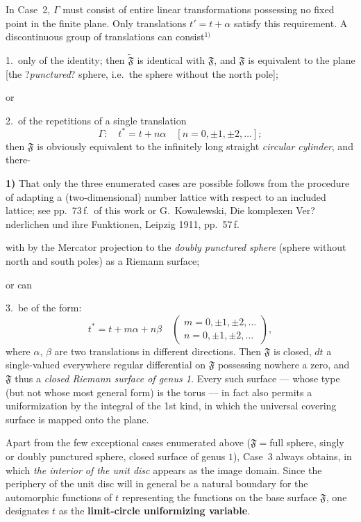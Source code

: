 \documentclass{article}
\begin{document}
In Case~2, $\varGamma$ must consist of entire linear transformations possessing no fixed point in the finite plane. Only translations $t' = t + \alpha$ satisfy this requirement. A discontinuous group of translations can consist${}^{1)}$

1.\ only of the identity; then $\widetilde{\mathfrak{F}}$ is identical with $\mathfrak{F}$, and $\mathfrak{F}$ is equivalent to the plane [the ?\emph{punctured}? sphere, i.e.\ the sphere without the north pole];

or

2.\ of the repetitions of a single translation
\[ \varGamma\colon \quad t^* = t + n\alpha \quad [n = 0, \pm 1, \pm 2, \dots]; \]
then $\mathfrak{F}$ is obviously equivalent to the infinitely long straight \emph{circular cylinder}, and there-

\textbf{1)} That only the three enumerated cases are possible follows from the procedure of adapting a (two-dimensional) number lattice with respect to an included lattice; see pp.~73\,f.\ of this work or G.~Kowalewski, Die komplexen Ver?nderlichen und ihre Funktionen, Leipzig 1911, pp.~57\,f.

with by the Mercator projection to the \emph{doubly punctured sphere} (sphere without north and south poles) as a Riemann surface;

or can

3.\ be of the form:
\[ t^* = t + m\alpha + n\beta \quad \begin{pmatrix} m = 0, \pm 1, \pm 2, \dots \\ n = 0, \pm 1, \pm 2, \dots \end{pmatrix}, \]
where $\alpha$, $\beta$ are two translations in different directions. Then $\mathfrak{F}$ is closed, $dt$ a single-valued everywhere regular differential on $\mathfrak{F}$ possessing nowhere a zero, and $\mathfrak{F}$ thus a \emph{closed Riemann surface of genus 1.} Every such surface --- whose type (but not whose most general form) is the torus --- in fact also permits a uniformization by the integral of the 1st kind, in which the universal covering surface is mapped onto the plane.

Apart from the few exceptional cases enumerated above ($\mathfrak{F} = {}$full sphere, singly or doubly punctured sphere, closed surface of genus $1$), Case~3 always obtains, in which \emph{the interior of the unit disc} appears as the image domain. Since the periphery of the unit disc will in general be a natural boundary for the automorphic functions of $t$ representing the functions on the base surface $\mathfrak{F}$, one designates $t$ as the \textbf{limit-circle uniformizing variable}.
\end{document}

